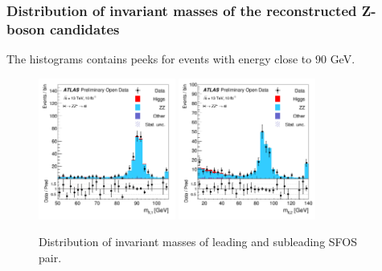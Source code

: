 \documentclass[aspectratio=1610, english]{beamer}
\begin{document}
\begin{frame}
\frametitle{Distribution of invariant masses of the reconstructed Z-boson candidates}

The histograms contains peeks for events with energy close to $90$ GeV.

\begin{figure} [H]
\centering
\includegraphics[width=0.4\textwidth]{hist_mLL1.png}
\includegraphics[width=0.4\textwidth]{hist_mLL2.png}
\caption{Distribution of invariant masses of leading and subleading SFOS pair. }
\end{figure}

\end{frame}
\end{document}
